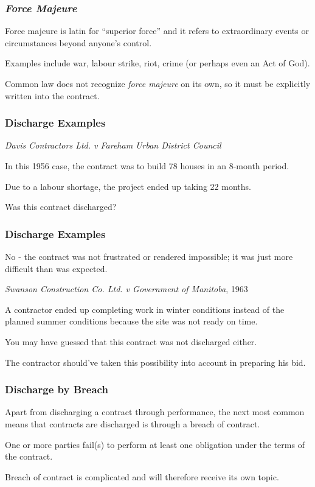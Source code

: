 \begin{frame}
\frametitle{\textit{Force Majeure}}

\alert{Force majeure} is latin for ``superior force'' and it refers to extraordinary events or circumstances beyond anyone's control.

Examples include war, labour strike, riot, crime (or perhaps even an Act of God).

Common law does not recognize \textit{force majeure} on its own, so it must be explicitly written into the contract. 

\end{frame}



\begin{frame}
\frametitle{Discharge Examples}

\textit{Davis Contractors Ltd. v Fareham Urban District Council}

In this 1956 case, the contract was to build 78 houses in an 8-month period.

Due to a labour shortage, the project ended up taking 22 months.

Was this contract discharged?

\end{frame}



\begin{frame}
\frametitle{Discharge Examples}

No - the contract was not frustrated or rendered impossible; it was just more difficult than was expected.


\textit{Swanson Construction Co. Ltd. v Government of Manitoba}, 1963

A contractor ended up completing work in winter conditions instead of the planned summer conditions because the site was not ready on time.

You may have guessed that this contract was not discharged either.

The contractor should've taken this possibility into account in preparing his bid.

\end{frame}



\begin{frame}
\frametitle{Discharge by Breach}

Apart from discharging a contract through performance, the next most common means that contracts are discharged is through a breach of contract.

One or more parties fail(s) to perform at least one obligation under the terms of the contract.

Breach of contract is complicated and will therefore receive its own topic.

\end{frame}





